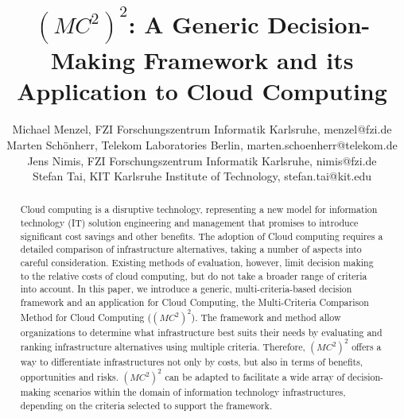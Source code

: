 \documentclass[journal,final,a4paper,twoside]{IEEEtran}
\begin{document}
\title{$(MC^2)^2$: A Generic Decision-Making Framework 
and its Application to Cloud Computing}


\author{Michael Menzel, FZI Forschungszentrum Informatik Karlsruhe, menzel@fzi.de\\
        Marten Sch\"onherr, Telekom Laboratories Berlin, marten.schoenherr@telekom.de\\
        Jens Nimis, FZI Forschungszentrum Informatik Karlsruhe, nimis@fzi.de\\
        Stefan Tai, KIT Karlsruhe Institute of Technology, stefan.tai@kit.edu}



















\maketitle


\begin{abstract}
Cloud computing is a disruptive technology, representing a new model for information technology (IT) solution engineering and management that promises to introduce significant cost savings and other benefits. The adoption of Cloud computing requires a detailed comparison of infrastructure alternatives, taking a number of aspects into careful consideration. Existing methods of evaluation, however, limit decision making to the relative costs of cloud computing, but do not take a broader range of criteria into account. In this paper, we introduce a generic, multi-criteria-based decision framework and an application for Cloud Computing, the Multi-Criteria Comparison Method for Cloud Computing ($(MC^2)^2$). The framework and method allow organizations to determine what infrastructure best suits their needs by evaluating and ranking infrastructure alternatives using multiple criteria. Therefore, $(MC^2)^2$ offers a way to differentiate infrastructures not only by costs, but also in terms of benefits, opportunities and risks. $(MC^2)^2$ can be adapted to facilitate a wide array of decision-making scenarios within the domain of information technology infrastructures, depending on the criteria selected to support the framework.
\end{abstract}
\end{document}
